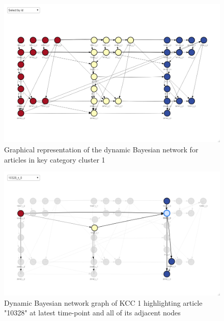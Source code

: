 


\begin{figure}[H]
\centering
  \includegraphics[width=0.95\linewidth]{figures/dbn_kcc_1_all.png}
  \caption{Graphical representation of the dynamic Bayesian network for articles in key category cluster 1}
  \label{fig:dbn_kcc_1_all}
\end{figure}




\begin{figure}[H]
\centering
  \includegraphics[width=0.95\linewidth]{figures/dbn_kcc_1_article_10328_t_0.png}
  \caption{Dynamic Bayesian network graph of KCC 1 highlighting article "10328" at latest time-point and all of its adjacent nodes}
  \label{fig:dbn_kcc_1_article_10328_t_0}
\end{figure}



